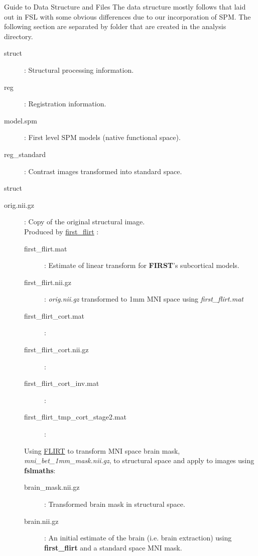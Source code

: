 \documentclass[]{report}
\begin{document}
\begin{chapter}{Guide to Data Structure and Files}
The data structure mostly follows that laid out in FSL with some obvious differences due to our incorporation of SPM. The following section are separated by folder that are created in the analysis directory.
\begin{description}
	\item [struct ]  : Structural processing information.  
	\item [reg] :  Registration information.
	\item [model.spm ] : First level SPM models (native functional space). 
	\item [reg\_standard ] : Contrast images transformed into standard space.
\end{description}
\begin{section}{struct}
	\begin{description}
	
	\item[orig.nii.gz] : Copy of the original structural image.\\
	
	{\large Produced by \href{http://fsl.fmrib.ox.ac.uk/fsl/fsl-4.1.9/first/index.html}{\color{blue} first\_flirt} : }
	\begin{description}
	
		 \item[first\_flirt.mat] : Estimate of linear transform for {\bf FIRST}'s subcortical models. 
		\item[first\_flirt.nii.gz] : {\it orig.nii.gz} transformed to 1mm MNI space using {\it first\_flirt.mat }
		\item[first\_flirt\_cort.mat] :
		\item[first\_flirt\_cort.nii.gz] :
		\item[first\_flirt\_cort\_inv.mat] :
		\item[first\_flirt\_tmp\_cort\_stage2.mat] :
	\end{description}
	Using  \href{http://fsl.fmrib.ox.ac.uk/fsl/fslwiki/FLIRT}{\color{blue} FLIRT} to transform MNI space brain mask, {\it mni\_bet\_1mm\_mask.nii.gz}, to structural space and apply to images using {\bf fslmaths}: 
	\begin{description}
		\item[brain\_mask.nii.gz] : Transformed brain mask in structural space.
		\item[brain.nii.gz] : An initial estimate of the brain (i.e. brain extraction) using {\bf first\_flirt } and a standard space MNI mask. 
	\end{description}


\end{description}
\end{section}
\end{chapter}
\end{document}
